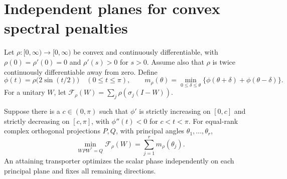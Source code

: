 \section{Independent planes for convex spectral penalties}
\label{sec:spectral-penalty-transport}

Let $\rho:[0,\infty)\to[0,\infty)$ be convex and continuously
differentiable, with $\rho(0)=\rho'(0)=0$ and $\rho'(s)>0$ for $s>0$.
Assume also that $\rho$ is twice continuously differentiable away from
zero. Define
\[
 \phi(t)=\rho\bigl(2\sin(t/2)\bigr)\quad(0\leq t\leq\pi),
 \qquad
 m_\rho(\theta)=\min_{0\leq\delta\leq\theta}
       \{\phi(\theta+\delta)+\phi(\theta-\delta)\}.
\]
For a unitary $W$, let
$\mathcal F_\rho(W)=\sum_j\rho(\sigma_j(I-W))$.

\begin{theorem}
\label{thm:spectral-penalty-decoupling}
Suppose there is a $c\in(0,\pi)$ such that $\phi'$ is strictly
increasing on $[0,c]$ and strictly decreasing on $[c,\pi]$, with
$\phi''(t)<0$ for $c<t<\pi$. For equal-rank complex orthogonal
projections $P,Q$, with principal angles $\theta_1,\ldots,\theta_r$,
\[
 \min_{WPW^*=Q}\mathcal F_\rho(W)
       =\sum_{j=1}^r m_\rho(\theta_j).
\]
An attaining transporter optimizes the scalar phase independently on each
principal plane and fixes all remaining directions.
\end{theorem}

